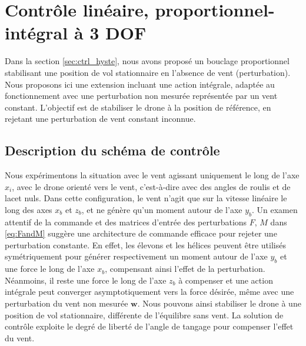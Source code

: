 \section{Contrôle linéaire, proportionnel-intégral à 3 DOF}
\label{sec:3dofcmd}
Dans la section \ref{sec:ctrl_hyste}, nous avons proposé un bouclage proportionnel stabilisant une position de vol stationnaire en l'absence de vent (perturbation). Nous proposons ici une extension incluant une action intégrale, adaptée au fonctionnement avec une perturbation non mesurée représentée par un vent constant. L'objectif est de stabiliser le drone à la position de référence, en rejetant une perturbation de vent constant inconnue.

\subsection{Description du schéma de contrôle}
Nous expérimentons la situation avec le vent agissant uniquement le long de l'axe $x_{i}$, avec le drone orienté vers le vent, c'est-à-dire avec des angles de roulis et de lacet nuls. Dans cette configuration, le vent n'agit que sur la vitesse linéaire le long des axes $x_{b}$ et $z_{b}$, et ne génère qu'un moment autour de l'axe $y_{b}$. Un examen attentif de la commande et des matrices d'entrée des perturbations $F$, $M$ dans \eqref{eq:FandM} suggère une architecture de commande efficace pour rejeter une perturbation constante. En effet, les élevons et les hélices peuvent être utilisés symétriquement pour générer respectivement un moment autour de l'axe $y_{b}$ et une force le long de l'axe $x_{b}$, compensant ainsi l'effet de la perturbation. Néanmoins, il reste une force le long de l'axe $z_{b}$ à compenser et une action intégrale peut converger asymptotiquement vers la force désirée, même avec une perturbation du vent non mesurée $\boldsymbol{w}$. Nous pouvons ainsi stabiliser le drone à une position de vol stationnaire, différente de l'équilibre sans vent. La solution de contrôle exploite le degré de liberté de l'angle de tangage pour compenser l'effet du vent.

